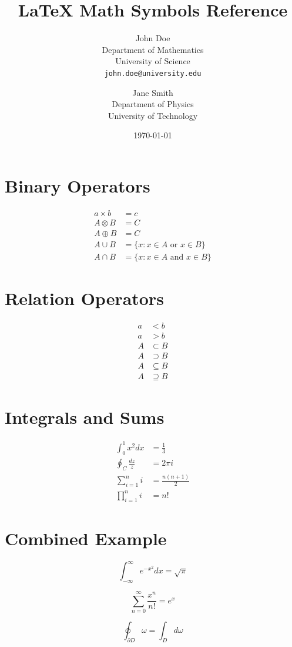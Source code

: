 \documentclass{article}
\title{\Large LaTeX Math Symbols Reference}\\
\author{
	John Doe \\
	Department of Mathematics \\
	University of Science \\
	\texttt{john.doe@university.edu}
	\and
	Jane Smith \\
	Department of Physics \\
	University of Technology
}
\date{\today}
\begin{document}
	
	\maketitle
	
	\section{Binary Operators}
	\begin{align*}
		a \times b &= c \\
		A \otimes B &= C \\
		A \oplus B &= C \\
		A \cup B &= \{x : x \in A \text{ or } x \in B\} \\
		A \cap B &= \{x : x \in A \text{ and } x \in B\}
	\end{align*}
	
	\section{Relation Operators}
	\begin{align*}
		a &< b \\
		a &> b \\
		A &\subset B \\
		A &\supset B \\
		A &\subseteq B \\
		A &\supseteq B
	\end{align*}
	
	\section{Integrals and Sums}
	\begin{align*}
		\int_0^1 x^2 dx &= \frac{1}{3} \\
		\oint_C \frac{dz}{z} &= 2\pi i \\
		\sum_{i=1}^n i &= \frac{n(n+1)}{2} \\
		\prod_{i=1}^n i &= n!
	\end{align*}
	
	\section{Combined Example}
	\[
	\int_{-\infty}^{\infty} e^{-x^2} dx = \sqrt{\pi}
	\]
	
	\[
	\sum_{n=0}^{\infty} \frac{x^n}{n!} = e^x
	\]
	
	\[
	\oint_{\partial D} \omega = \int_D d\omega
	\]
	
\end{document}
